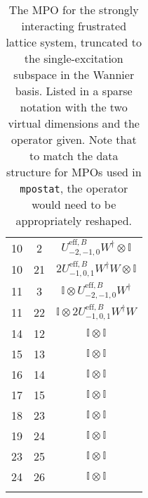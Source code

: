 \begin{longtable}{ccc}
	10 & 2  & \(U^{\mathrm{eff},B}_{-2,-1,0}W^{\dagger} \otimes \mathbb{I}\) \\
	10 & 21 & \(2U^{\mathrm{eff},B}_{-1,0,1}W^{\dagger}W \otimes \mathbb{I}\) \\
	11 & 3  & \(\mathbb{I} \otimes U^{\mathrm{eff},B}_{-2,-1,0}W^{\dagger}\) \\
	11 & 22 & \(\mathbb{I} \otimes 2U^{\mathrm{eff},B}_{-1,0,1}W^{\dagger}W\) \\
	14 & 12 & \(\mathbb{I} \otimes \mathbb{I}\) \\
	15 & 13 & \(\mathbb{I} \otimes \mathbb{I}\) \\
	16 & 14 & \(\mathbb{I} \otimes \mathbb{I}\) \\
	17 & 15 & \(\mathbb{I} \otimes \mathbb{I}\) \\
	18 & 23 & \(\mathbb{I} \otimes \mathbb{I}\) \\
	19 & 24 & \(\mathbb{I} \otimes \mathbb{I}\) \\
	23 & 25 & \(\mathbb{I} \otimes \mathbb{I}\) \\
	24 & 26 & \(\mathbb{I} \otimes \mathbb{I}\) \\
	\hline
	\caption{\label{tab:dim3-2}The MPO for the strongly interacting frustrated lattice system, truncated to the single-excitation subspace in the Wannier basis. Listed in a sparse notation with the two virtual dimensions and the operator given. Note that to match the data structure for MPOs used in \lstinline$mpostat$, the operator would need to be appropriately reshaped. } 	
\end{longtable}

